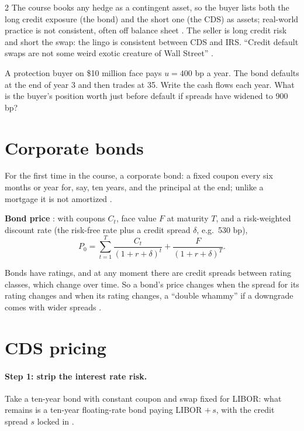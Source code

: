 \begin{paracol}{2}
The course books any hedge as a contingent asset, so the buyer lists both the long credit exposure (the bond) and the short one (the CDS) as assets; real-world
practice is not consistent, often off balance sheet . The seller is long credit risk and short the swap: the
lingo is consistent between CDS and IRS. ``Credit default swaps are not some weird exotic creature of Wall Street'' .

\begin{exercise}
A protection buyer on \$10 million face pays $u=400$ bp a year. The bond defaults at the end of year 3 and then trades at 35. Write the cash flows each year. What is
the buyer's position worth just before default if spreads have widened to 900 bp?
\end{exercise}

\section{Corporate bonds}\label{sec:cds-bonds}

For the first time in the course, a corporate bond: a fixed coupon every six months or year for, say, ten years, and the principal at the end; unlike a mortgage it
is not amortized .
\begin{keyformulas}
\textbf{Bond price} : with coupons $C_t$, face value $F$ at maturity $T$, and a risk-weighted discount rate
(the risk-free rate plus a credit spread $\delta$, e.g.\ 530 bp),
\[
  P_0 = \sum_{t=1}^{T}\frac{C_t}{(1+r+\delta)^t} + \frac{F}{(1+r+\delta)^T}.
\]
\end{keyformulas}
Bonds have ratings, and at any moment there are credit spreads between rating classes, which change over time. So a bond's price changes when the spread for its
rating changes and when its rating changes, a ``double whammy'' if a downgrade comes with wider spreads .

\section{CDS pricing}\label{sec:cds-pricing}

\paragraph{Step 1: strip the interest rate risk.} Take a ten-year bond with constant coupon and swap fixed for LIBOR: what remains is a ten-year floating-rate bond paying
LIBOR $+\,s$, with the credit spread $s$ locked in .


\end{paracol}
